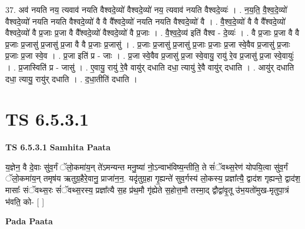 \documentclass[17pt]{extarticle}
\begin{document}
37. अव॑ नयति नय॒ त्यवाव॑ नयति वैश्वदे॒व्यो॑ वैश्वदे॒व्यो॑ नय॒ त्यवाव॑ नयति वैश्वदे॒व्यः॑ । . न॒य॒ति॒ वै॒श्व॒दे॒व्यो॑ वैश्वदे॒व्यो॑ नयति नयति वैश्वदे॒व्यो॑ वै वै वै᳚श्वदे॒व्यो॑ नयति नयति वैश्वदे॒व्यो॑ वै । . वै॒श्व॒दे॒व्यो॑ वै वै वै᳚श्वदे॒व्यो॑ वैश्वदे॒व्यो॑ वै प्र॒जाः प्र॒जा वै वै᳚श्वदे॒व्यो॑ वैश्वदे॒व्यो॑ वै प्र॒जाः । . वै॒श्व॒दे॒व्य॑ इति॑ वैश्व - दे॒व्यः॑ । . वै प्र॒जाः प्र॒जा वै वै प्र॒जाः प्र॒जासु॑ प्र॒जासु॑ प्र॒जा वै वै प्र॒जाः प्र॒जासु॑ । . प्र॒जाः प्र॒जासु॑ प्र॒जासु॑ प्र॒जाः प्र॒जाः प्र॒जा स्वे॒वैव प्र॒जासु॑ प्र॒जाः प्र॒जाः प्र॒जा स्वे॒व । . प्र॒जा इति॑ प्र - जाः । . प्र॒जा स्वे॒वैव प्र॒जासु॑ प्र॒जा स्वे॒वायु॒ रायु॑ रे॒व प्र॒जासु॑ प्र॒जा स्वे॒वायुः॑ । . प्र॒जास्विति॑ प्र - जासु॑ । . ए॒वायु॒ रायु॑ रे॒वै वायु॑र् दधाति दधा॒ त्यायु॑ रे॒वै वायु॑र् दधाति । . आयु॑र् दधाति दधा॒ त्यायु॒ रायु॑र् दधाति । . द॒धा॒तीति॑ दधाति । \newline
\pagebreak
{}

\section{ TS 6.5.3.1 }

\textbf{TS 6.5.3.1 } \newline
\textbf{Samhita Paata} \newline

य॒ज्ञेन॒ वै दे॒वाः सु॑व॒र्गं ॅलो॒कमा॑य॒न् ते॑ऽमन्यन्त मनु॒ष्या॑ नो॒ऽन्वाभ॑विष्य॒न्तीति॒ ते सं॑ॅवथ्स॒रेण॑ योपयि॒त्वा सु॑व॒र्गं ॅलो॒कमा॑य॒न् तमृष॑य ऋतुग्र॒हैरे॒वानु॒ प्राजा॑न॒न॒. यदृ॑तुग्र॒हा गृ॒ह्यन्ते॑ सुव॒र्गस्य॑ लो॒कस्य॒ प्रज्ञा᳚त्यै॒ द्वाद॑श गृह्यन्ते॒ द्वाद॑श॒ मासाः᳚ संॅवथ्स॒रः सं॑ॅवथ्स॒रस्य॒ प्रज्ञा᳚त्यै स॒ह प्र॑थ॒मौ गृ॑ह्येते स॒होत्त॒मौ तस्मा॒द् द्वौद्वा॑वृ॒तू उ॑भ॒यतो॑मुख-मृतुपा॒त्रं भ॑वति॒ को- [  ] \newline

\textbf{Pada Paata} \newline
\end{document}
